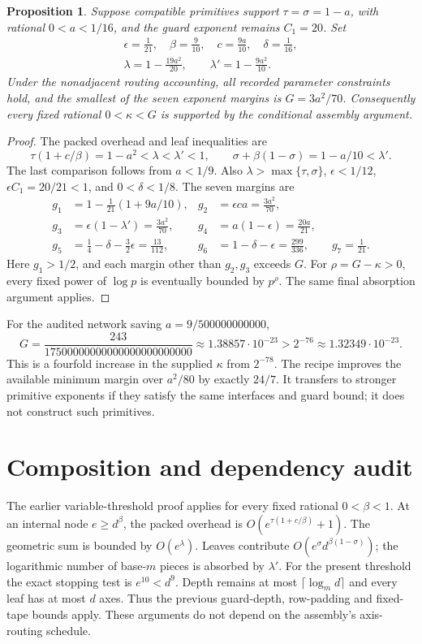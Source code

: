 \documentclass[11pt]{article}
\newtheorem{proposition}{Proposition}
\begin{document}
\begin{proposition}
Suppose compatible primitives support $\tau=\sigma=1-a$, with rational
$0<a<1/16$, and the guard exponent remains $C_1=20$. Set
\begin{gather*}
 \epsilon=\frac1{21},\quad \beta=\frac9{10},\quad c=\frac{9a}{10},\quad
 \delta=\frac1{16},\\
 \lambda=1-\frac{19a^2}{20},\qquad \lambda'=1-\frac{9a^2}{10}.
\end{gather*}
Under the nonadjacent routing accounting, all recorded parameter constraints
hold, and the smallest of the seven exponent margins is $G=3a^2/70$.
Consequently every fixed rational $0<\kappa<G$ is supported by the conditional
assembly argument.
\end{proposition}
\begin{proof}
The packed overhead and leaf inequalities are
\[
 \tau(1+c/\beta)=1-a^2<\lambda<\lambda'<1,
 \qquad \sigma+\beta(1-\sigma)=1-a/10<\lambda'.
\]
The last comparison follows from $a<1/9$. Also
$\lambda>\max\{\tau,\sigma\}$, $\epsilon<1/12$,
$\epsilon C_1=20/21<1$, and $0<\delta<1/8$.
The seven margins are
\begin{align*}
 g_1&=1-\tfrac1{21}(1+9a/10),&
 g_2&=\epsilon ca=\tfrac{3a^2}{70},\\
 g_3&=\epsilon(1-\lambda')=\tfrac{3a^2}{70},&
 g_4&=a(1-\epsilon)=\tfrac{20a}{21},\\
 g_5&=\tfrac14-\delta-\tfrac32\epsilon=\tfrac{13}{112},&
 g_6&=1-\delta-\epsilon=\tfrac{299}{336},\qquad
 g_7=\tfrac1{21}.
\end{align*}
Here $g_1>1/2$, and each margin other than $g_2,g_3$ exceeds $G$.
For $\rho=G-\kappa>0$, every fixed power of $\log p$ is eventually bounded
by $p^\rho$. The same final absorption argument applies.
\end{proof}

For the audited network saving $a=9/500000000000$,
\[
 G=\frac{243}{17500000000000000000000000}
 \approx1.38857\cdot10^{-23}>2^{-76}
 \approx1.32349\cdot10^{-23}.
\]
This is a fourfold increase in the supplied $\kappa$ from $2^{-78}$.
The recipe improves the available minimum margin over $a^2/80$ by exactly
$24/7$. It transfers to stronger primitive exponents if they satisfy the
same interfaces and guard bound; it does not construct such primitives.

\section{Composition and dependency audit}
The earlier variable-threshold proof applies for every fixed rational
$0<\beta<1$. At an internal node $e\ge d^\beta$, the packed overhead is
$O(e^{\tau(1+c/\beta)}+1)$. The geometric sum is bounded by $O(e^\lambda)$.
Leaves contribute $O(e^\sigma d^{\beta(1-\sigma)})$; the logarithmic number
of base-$m$ pieces is absorbed by $\lambda'$.
For the present threshold the exact stopping test is $e^{10}<d^9$.
Depth remains at most $\lceil\log_m d\rceil$ and every leaf has at most
$d$ axes. Thus the previous guard-depth, row-padding and fixed-tape bounds
apply. These arguments do not depend on the assembly's axis-routing schedule.
\end{document}
